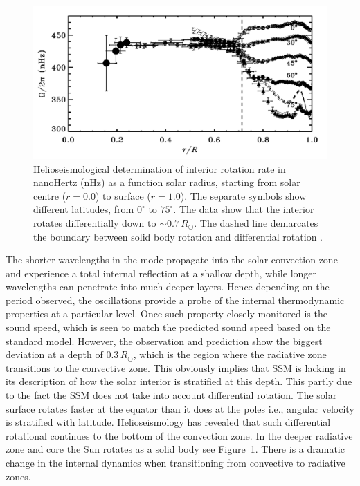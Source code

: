 \begin{figure}[!t]
\begin{center}
\includegraphics[trim = 0cm 0.5cm 0cm 0cm, width=1.0\textwidth]{images/differential_rot.png}
\caption{Helioseismological determination of interior rotation rate in nanoHertz (nHz) as a function solar radius, starting from solar centre ($r=0.0$) to surface ($r=1.0$). The separate symbols show different latitudes, from $0^{\circ}$ to $75^{\circ}$. The data show that the interior rotates differentially down to $\sim$$0.7\,R_{\odot}$. The dashed line demarcates the boundary between solid body rotation and differential rotation \citep{thompson2003}.}
\label{fig:diff_rot} 
\end{center}
\end{figure}


The shorter wavelengths in the mode propagate into the solar convection zone and experience a total internal reflection at a shallow depth, while longer wavelengths can penetrate into much deeper layers. Hence depending on the period observed, the oscillations provide a probe of the internal thermodynamic properties at a particular level. Once such property closely monitored is the sound speed, which is seen to match the predicted sound speed based on the standard model. However, the observation and prediction show the biggest deviation at a depth of $0.3\,R_{\odot}$, which is the region where the radiative zone transitions to the convective zone. This obviously implies that SSM is lacking in its description of how the solar interior is stratified at this depth. This partly due to the fact the SSM does not take into account differential rotation. The solar surface rotates faster at the equator than it does at the poles i.e., angular velocity is stratified with latitude. Helioseismology has revealed that such differential rotational continues to the bottom of the convection zone. In the deeper radiative zone and core the Sun rotates as a solid body see Figure~\ref{fig:diff_rot}. There is a dramatic change in the internal dynamics when transitioning from convective to radiative zones. 

